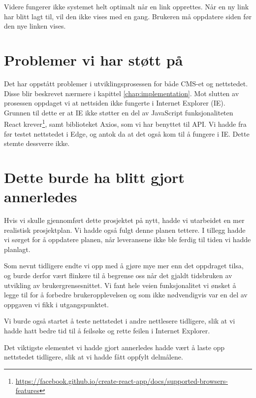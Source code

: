 Videre fungerer ikke systemet helt optimalt når en link opprettes. Når en ny link har blitt lagt til, vil den ikke vises med en gang. Brukeren må oppdatere siden før den nye linken vises.

\section{Problemer vi har støtt på}
Det har oppstått problemer i utviklingsprosessen for både CMS-et og nettstedet. Disse blir beskrevet nærmere i kapittel \ref{chap:implementation}. Mot slutten av prosessen oppdaget vi at nettsiden ikke fungerte i Internet Explorer (IE). Grunnen til dette er at IE ikke støtter en del av JavaScript funksjonaliteten React krever\footnote{\url{https://facebook.github.io/create-react-app/docs/supported-browsers-features}}, samt biblioteket Axios, som vi har benyttet til API. Vi hadde fra før testet nettstedet i Edge, og antok da at det også kom til å fungere i IE. Dette stemte dessverre ikke.

\section{Dette burde ha blitt gjort annerledes}
Hvis vi skulle gjennomført dette prosjektet på nytt, hadde vi utarbeidet en mer realistisk prosjektplan. Vi hadde også fulgt denne planen tettere. I tillegg hadde vi sørget for å oppdatere planen, når leveransene ikke ble ferdig til tiden vi hadde planlagt.

Som nevnt tidligere endte vi opp med å gjøre mye mer enn det oppdraget tilsa, og burde derfor vært flinkere til å begrense oss når det gjaldt tidsbruken av utvikling av brukergrensesnittet. Vi fant hele veien funksjonalitet vi ønsket å legge til for å forbedre brukeropplevelsen og som ikke nødvendigvis var en del av oppgaven vi fikk i utgangspunktet. 

Vi burde også startet å teste nettstedet i andre nettlesere tidligere, slik at vi hadde hatt bedre tid til å feilsøke og rette feilen i Internet Explorer.

Det viktigste elementet vi hadde gjort annerledes hadde vært å laste opp nettstedet tidligere, slik at vi hadde fått oppfylt delmålene. 
